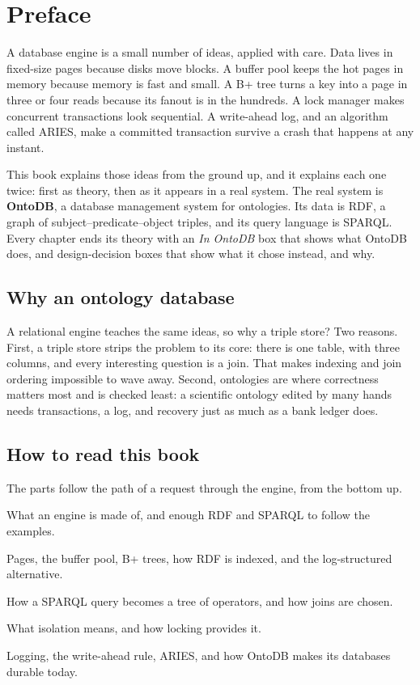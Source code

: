 \chapter*{Preface}

A database engine is a small number of ideas, applied with care. Data lives in
fixed-size pages because disks move blocks. A buffer pool keeps the hot pages
in memory because memory is fast and small. A B+ tree turns a key into a page
in three or four reads because its fanout is in the hundreds. A lock manager
makes concurrent transactions look sequential. A write-ahead log, and an
algorithm called ARIES, make a committed transaction survive a crash that
happens at any instant.

This book explains those ideas from the ground up, and it explains each one
twice: first as theory, then as it appears in a real system. The real system
is \textbf{OntoDB}, a database management system for ontologies. Its data is
RDF, a graph of subject--predicate--object triples, and its query language is
SPARQL. Every chapter ends its theory with an \emph{In OntoDB} box that shows
what OntoDB does, and design-decision boxes that show what it chose instead,
and why.

\section*{Why an ontology database}

A relational engine teaches the same ideas, so why a triple store? Two reasons.
First, a triple store strips the problem to its core: there is one table, with
three columns, and every interesting question is a join. That makes indexing
and join ordering impossible to wave away. Second, ontologies are where
correctness matters most and is checked least: a scientific ontology edited by
many hands needs transactions, a log, and recovery just as much as a bank
ledger does.

\section*{How to read this book}

The parts follow the path of a request through the engine, from the bottom up.

\begin{description}[leftmargin=1.5em]
\item[Foundations] What an engine is made of, and enough RDF and SPARQL to follow the examples.
\item[Storage] Pages, the buffer pool, B+ trees, how RDF is indexed, and the log-structured alternative.
\item[Query processing] How a SPARQL query becomes a tree of operators, and how joins are chosen.
\item[Transactions] What isolation means, and how locking provides it.
\item[Recovery] Logging, the write-ahead rule, ARIES, and how OntoDB makes its databases durable today.
\end{description}

